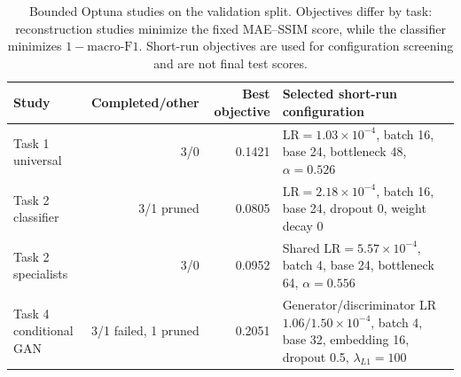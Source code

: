 \begin{table}[t]
\centering
\caption{Bounded Optuna studies on the validation split. Objectives differ by task: reconstruction studies minimize the fixed MAE--SSIM score, while the classifier minimizes $1-\mathrm{macro\mbox{-}F1}$. Short-run objectives are used for configuration screening and are not final test scores.}
\label{tab:optuna}
\footnotesize
\begin{tabular}{lrrp{}}
\toprule
Study & Completed/other & Best objective & Selected short-run configuration \\
\midrule
Task 1 universal & 3/0 & 0.1421 & $\mathrm{LR}=1.03\times10^{-4}$, batch 16, base 24, bottleneck 48, $\alpha=0.526$ \\
Task 2 classifier & 3/1 pruned & 0.0805 & $\mathrm{LR}=2.18\times10^{-4}$, batch 16, base 24, dropout 0, weight decay 0 \\
Task 2 specialists & 3/0 & 0.0952 & Shared $\mathrm{LR}=5.57\times10^{-4}$, batch 4, base 24, bottleneck 64, $\alpha=0.556$ \\
Task 4 conditional GAN & 3/1 failed, 1 pruned & 0.2051 & Generator/discriminator LR $1.06/1.50\times10^{-4}$, batch 4, base 32, embedding 16, dropout 0.5, $\lambda_{L1}=100$ \\
\bottomrule
\end{tabular}
\end{table}
